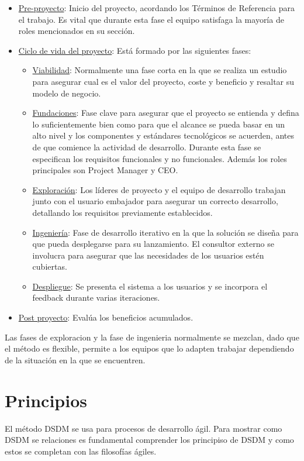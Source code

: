 \documentclass[12pt,a4paper]{article}
\begin{document}
\begin{itemize}
	\item \underline{Pre-proyecto}: Inicio del proyecto, acordando los Términos de Referencia para el trabajo. Es vital que durante esta fase el equipo satisfaga la mayoría de roles mencionados en su sección.
	\item \underline{Ciclo de vida del proyecto}: Está formado por las siguientes fases:
	\begin{itemize}
		\item \underline{Viabilidad}: Normalmente una fase corta en la que se realiza un estudio para asegurar cual es el valor del proyecto, coste y beneficio y resaltar su modelo de negocio.
		\item \underline{Fundaciones}: Fase clave para asegurar que el proyecto se entienda y defina lo suficientemente bien como para que el alcance se pueda basar en un alto nivel y los componentes y estándares tecnológicos se acuerden, antes de que comience la actividad de desarrollo. Durante esta fase se especifican los requisitos funcionales y no funcionales. Además los roles principales son Project Manager y CEO.
		\item \underline{Exploración}: Los líderes de proyecto y el equipo de desarrollo trabajan junto con el usuario embajador para asegurar un correcto desarrollo, detallando los requisitos previamente establecidos.
		\item \underline{Ingeniería}: Fase de desarrollo iterativo en la que la solución se diseña para que pueda desplegarse para su lanzamiento. El consultor externo se involucra para asegurar que las necesidades de los usuarios estén cubiertas.
		\item \underline{Despliegue}: Se presenta el sistema a los usuarios y se incorpora el feedback durante varias iteraciones.
	\end{itemize}
 	\item \underline{Post proyecto}: Evalúa los beneficios acumulados.
\end{itemize}
	
Las fases de exploracion y la fase de ingenieria normalmente se mezclan, dado que el método es flexible, permite a los equipos que lo adapten trabajar dependiendo de la situación en la que se encuentren.


\section{Principios}
El método DSDM se usa para procesos de desarrollo ágil. Para mostrar como DSDM se relaciones es fundamental comprender los principiso de DSDM y como estos se completan con las filosofías ágiles.\\
\end{document}
